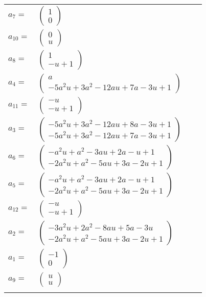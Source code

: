 \documentclass[1p]{elsarticle_modified}
\theoremstyle{definition}
\begin{document}
\begin{tabular}{m{7pt} m{180pt} m{7pt} m{180pt} }
\flushright $a_{7}=$&$\begin{pmatrix}1\\0\end{pmatrix}$ \\
\flushright $a_{10}=$&$\begin{pmatrix}0\\u\end{pmatrix}$ \\
\flushright $a_{8}=$&$\begin{pmatrix}1\\- u+1\end{pmatrix}$ \\
\flushright $a_{4}=$&$\begin{pmatrix}a\\-5 a^2 u+3 a^2-12 a u+7 a-3 u+1\end{pmatrix}$ \\
\flushright $a_{11}=$&$\begin{pmatrix}- u\\- u+1\end{pmatrix}$ \\
\flushright $a_{3}=$&$\begin{pmatrix}-5 a^2 u+3 a^2-12 a u+8 a-3 u+1\\-5 a^2 u+3 a^2-12 a u+7 a-3 u+1\end{pmatrix}$ \\
\flushright $a_{6}=$&$\begin{pmatrix}- a^2 u+a^2-3 a u+2 a- u+1\\-2 a^2 u+a^2-5 a u+3 a-2 u+1\end{pmatrix}$ \\
\flushright $a_{5}=$&$\begin{pmatrix}- a^2 u+a^2-3 a u+2 a- u+1\\-2 a^2 u+a^2-5 a u+3 a-2 u+1\end{pmatrix}$ \\
\flushright $a_{12}=$&$\begin{pmatrix}- u\\- u+1\end{pmatrix}$ \\
\flushright $a_{2}=$&$\begin{pmatrix}-3 a^2 u+2 a^2-8 a u+5 a-3 u\\-2 a^2 u+a^2-5 a u+3 a-2 u+1\end{pmatrix}$ \\
\flushright $a_{1}=$&$\begin{pmatrix}-1\\0\end{pmatrix}$ \\
\flushright $a_{9}=$&$\begin{pmatrix}u\\u\end{pmatrix}$\\&\end{tabular}
\end{document}

